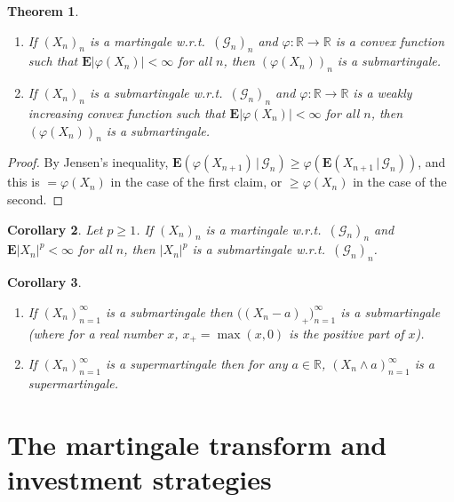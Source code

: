 \documentclass[11pt]{report}
\newcommand{\R}{\mathbb{R}}
\theoremstyle{plain}
\newtheorem{thm}{Theorem}[chapter]
\newtheorem{cor}[thm]{Corollary}
\theoremstyle{definition}
\begin{document}
\begin{thm}

\begin{enumerate}[label=\arabic*.]
\item If $(X_n)_n$ is a martingale w.r.t.\
$(\mathcal{G}_n)_n$ and $\varphi:\R\to\R$ is a convex
function such that $\mathbf{E}|\varphi(X_n)|<\infty$
for all $n$, then $(\varphi(X_n))_n$ is a
submartingale.

\item If $(X_n)_n$ is a submartingale w.r.t.\
$(\mathcal{G}_n)_n$ and $\varphi:\R\to\R$ is a weakly
increasing convex function such that
$\mathbf{E}|\varphi(X_n)|<\infty$ for all $n$, then
$(\varphi(X_n))_n$ is a submartingale.
\end{enumerate}

\end{thm}

\begin{proof}
By Jensen's inequality,
$\mathbf{E}\left(\varphi(X_{n+1})\,|\,\mathcal{G}_n\right)
\ge
\varphi\left(\mathbf{E}\left(X_{n+1}\,|\,\mathcal{G}_n\right)\right)$,
and this is $= \varphi(X_n)$ in the case of the first
claim, or $\ge \varphi(X_n)$ in the case of the
second.
\end{proof}

\begin{cor}
Let $p\ge 1$. If $(X_n)_n$ is a martingale w.r.t.\
$(\mathcal{G}_n)_n$ and $\mathbf{E}|X_n|^p<\infty$
for all $n$, then $|X_n|^p$ is a submartingale
w.r.t.\ $(\mathcal{G}_n)_n$.
\end{cor}

\begin{cor}
\label{cor-positive-part}

\begin{enumerate}[label=\arabic*.]
\item If $(X_n)_{n=1}^\infty$ is a submartingale then
$\big((X_n-a)_+\big)_{n=1}^\infty$ is a submartingale
(where for a real number $x$, $x_+ = \max(x,0)$ is
the positive part of $x$).

\item If $(X_n)_{n=1}^\infty$ is a supermartingale then for
any $a\in\R$, $(X_n\wedge a)_{n=1}^\infty$ is a
supermartingale.
\end{enumerate}

\end{cor}

\section{The martingale transform and investment strategies}
\end{document}
